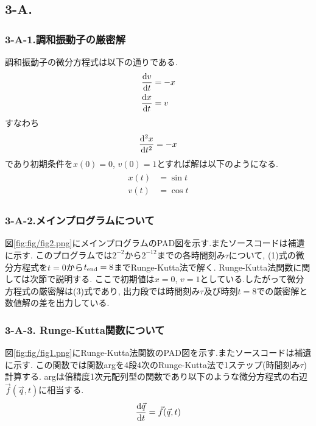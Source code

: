 \subsection*{3-A.}
\subsubsection*{3-A-1.調和振動子の厳密解}
調和振動子の微分方程式は以下の通りである.
\begin{align}
  \begin{split}
    \frac{{\rm d}v}{{\rm d}t}&=-x\\
    \frac{{\rm d}x}{{\rm d}t}&=v
  \end{split}
\end{align}
すなわち
\begin{align}
  \frac{{\rm d}^2x}{{\rm d}t^2}=-x
\end{align}
であり初期条件を$x(0)=0$, $v(0)=1$とすれば解は以下のようになる.
\begin{align}
  \begin{split}
    x(t)&=\sin t\\
    v(t)&=\cos t
  \end{split}
\end{align}
\subsubsection*{3-A-2.メインプログラムについて}
図\ref{fig:fig/fig2.png}にメインプログラムのPAD図を示す.またソースコードは補遺に示す.
このプログラムでは$2^{-2}$から$2^{-12}$までの各時間刻み$\tau$について,
(1)式の微分方程式を$t=0$から$t_{\rm end}=8$までRunge-Kutta法で解く.
Runge-Kutta法関数に関しては次節で説明する.
ここで初期値は$x=0$, $v=1$としている.したがって微分方程式の厳密解は(3)式であり,
出力段では時間刻み$\tau$及び時刻$t=8$での厳密解と数値解の差を出力している.
\subsubsection*{3-A-3. Runge-Kutta関数について}
図\ref{fig:fig/fig1.png}にRunge-Kutta法関数のPAD図を示す.またソースコードは補遺に示す.
この関数では関数argを4段4次のRunge-Kutta法で1ステップ(時間刻み$\tau$)計算する.
argは倍精度1次元配列型の関数であり以下のような微分方程式の右辺$\vec{f}(\vec{q},t)$に相当する.
\begin{align}
  \frac{{\rm d}\vec{q}}{{\rm d}t}=\vec{f}(\vec{q},t)
\end{align}
